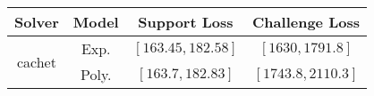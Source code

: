 \begin{tabular}{cc|c|c} 
\hline 
 Solver & Model & Support Loss  & Challenge Loss \tabularnewline\hline 
\hline 
\multirow{2}{*}{cachet} & Exp. & $\left[163.45,182.58\right]$ & $\left[1630,1791.8\right]$ \tabularnewline 
 & Poly. & $\left[163.7,182.83\right]$ & $\left[1743.8,2110.3\right]$ \tabularnewline 
\hline 
\end{tabular} 

